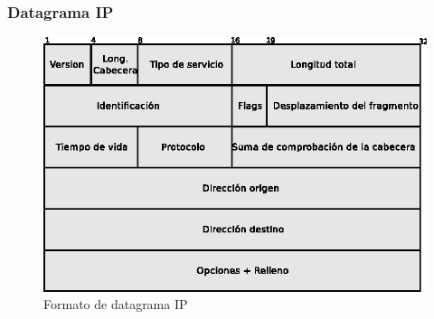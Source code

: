 \subsubsection{Datagrama IP}

\begin{figure}[h]
  \centering
	\includegraphics[width=1\textwidth]{2-sistema/graf/ip.eps}
  \caption{Formato de datagrama IP}
  \label{fig:ip}
\end{figure}

